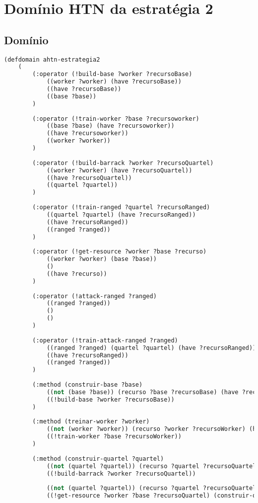 
\chapter{\label{ap:estra2}Domínio HTN da estratégia 2}

\section{Domínio}


\lstset{style=codeStyle}
\begin{lstlisting}[language=lisp]
(defdomain ahtn-estrategia2
	(
		(:operator (!build-base ?worker ?recursoBase)
			((worker ?worker) (have ?recursoBase))
			((have ?recursoBase))
			((base ?base))
		)
		
		(:operator (!train-worker ?base ?recursoworker)
			((base ?base) (have ?recursoworker))
			((have ?recursoworker))
			((worker ?worker))
		)
		
		(:operator (!build-barrack ?worker ?recursoQuartel)
			((worker ?worker) (have ?recursoQuartel))
			((have ?recursoQuartel))
			((quartel ?quartel))
		)
		
		(:operator (!train-ranged ?quartel ?recursoRanged)
			((quartel ?quartel) (have ?recursoRanged))
			((have ?recursoRanged))
			((ranged ?ranged))
		)
		
		(:operator (!get-resource ?worker ?base ?recurso)
			((worker ?worker) (base ?base))
			()
			((have ?recurso))
		)
		
		(:operator (!attack-ranged ?ranged)
			((ranged ?ranged))
			()
			()
		)
		
		(:operator (!train-attack-ranged ?ranged)
			((ranged ?ranged) (quartel ?quartel) (have ?recursoRanged))
			((have ?recursoRanged))
			((ranged ?ranged))
		)
		
		(:method (construir-base ?base)
			((not (base ?base)) (recurso ?base ?recursoBase) (have ?recursoBase) (worker ?worker))
			((!build-base ?worker ?recursoBase))
		)
		
		(:method (treinar-worker ?worker)
			((not (worker ?worker)) (recurso ?worker ?recursoWorker) (have ?recursoWorker) (base ?base))
			((!train-worker ?base ?recursoWorker))
		)
		
		(:method (construir-quartel ?quartel)
			((not (quartel ?quartel)) (recurso ?quartel ?recursoQuartel) (have ?recursoQuartel) (worker ?worker)) 
			((!build-barrack ?worker ?recursoQuartel))
			
			((not (quartel ?quartel)) (recurso ?quartel ?recursoQuartel) (not (have ?recursoQuartel)) (worker ?worker) (base ?base))
			((!get-resource ?worker ?base ?recursoQuartel) (construir-quartel ?quartel))
			

\end{lstlisting}
